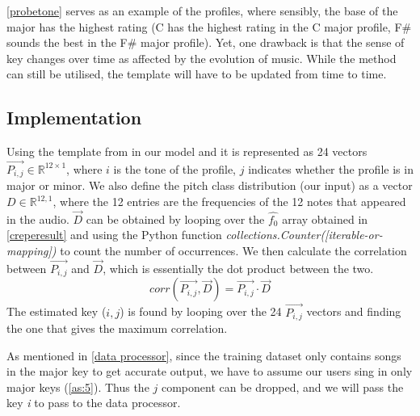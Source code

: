 \cref{probetone} serves as an example of the profiles, where sensibly, the base of the major has the highest rating (C has the highest rating in the C major profile, 
F\# sounds the best in the F\# major profile). 
Yet, one drawback is that the sense of key changes over time as affected by the evolution of music. While the method can still be utilised, the template will have to be
updated from time to time.

\subsection{Implementation}
Using the template from \cite{templatedata} in our model and it is represented as 24 vectors $\vec{P_{i,j}} \in \mathbb{R}^{12 \times 1}$, 
where $i$ is the tone of the profile, $j$ indicates whether the profile is in major or minor.
We also define the pitch class distribution (our input) as a vector $D \in \mathbb{R}^{12,1}$, where the 12 entries are the frequencies of the 12 notes that appeared in the audio.
$\vec{D}$ can be obtained by looping over the $\hat{f_0}$ array obtained in \cref{creperesult} and using the Python function \emph{collections.Counter([iterable-or-mapping])} to count the
number of occurrences. We then calculate the correlation between $\vec{P_{i,j}}$ and $\vec{D}$, which is essentially the dot product between the two.
\[ corr(\vec{P_{i,j}},\vec{D}) = \vec{P_{i,j}} \cdot \vec{D} \]
The estimated key ($i,j$) is found by looping over the 24 $\vec{P_{i,j}}$ vectors and finding the one that gives the maximum correlation.

As mentioned in \cref{data processor}, since the training dataset only contains songs in the major key to get accurate output, we have to assume our users sing in only
major keys (\cref{as:5}). Thus the $j$ component can be dropped, and we will pass the key \emph{i} to pass to the data processor.

